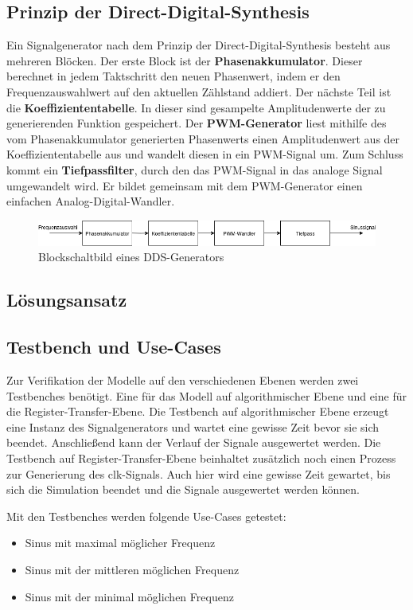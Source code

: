 \subsection{Prinzip der Direct-Digital-Synthesis}
Ein Signalgenerator nach dem Prinzip der Direct-Digital-Synthesis besteht aus mehreren Blöcken.
Der erste Block ist der \textbf{Phasenakkumulator}. Dieser berechnet in jedem Taktschritt den neuen Phasenwert,
indem er den Frequenzauswahlwert auf den aktuellen Zählstand addiert.
Der nächste Teil ist die \textbf{Koeffiziententabelle}. In dieser sind gesampelte Amplitudenwerte der zu 
generierenden Funktion gespeichert.
Der \textbf{PWM-Generator} liest mithilfe des vom Phasenakkumulator generierten
Phasenwerts einen Amplitudenwert aus der Koeffiziententabelle aus und wandelt diesen in ein PWM-Signal um.
Zum Schluss kommt ein \textbf{Tiefpassfilter}, durch den das PWM-Signal in das analoge Signal umgewandelt wird.
Er bildet gemeinsam mit dem PWM-Generator einen einfachen Analog-Digital-Wandler.

\begin{figure}[htbp]
    \centering
    \includegraphics[width=\linewidth]{img/blockschaltbild.png}
    \caption{Blockschaltbild eines DDS-Generators}
    \label{img_blockschaltbild}
\end{figure}

\subsection{Lösungsansatz}


\subsection{Testbench und Use-Cases}
Zur Verifikation der Modelle auf den verschiedenen Ebenen werden zwei Testbenches 
benötigt. Eine für das Modell auf algorithmischer Ebene und eine für die Register-Transfer-Ebene.
Die Testbench auf algorithmischer Ebene erzeugt eine Instanz des Signalgenerators und
wartet eine gewisse Zeit bevor sie sich beendet. Anschließend kann der Verlauf der
Signale ausgewertet werden.
Die Testbench auf Register-Transfer-Ebene beinhaltet zusätzlich noch einen Prozess
zur Generierung des clk-Signals. Auch hier wird eine gewisse Zeit gewartet, bis sich die
Simulation beendet und die Signale ausgewertet werden können.

\noindent Mit den Testbenches werden folgende Use-Cases getestet:
\begin{itemize}
    \item Sinus mit maximal möglicher Frequenz
    \item Sinus mit der mittleren möglichen Frequenz
    \item Sinus mit der minimal möglichen Frequenz
\end{itemize}